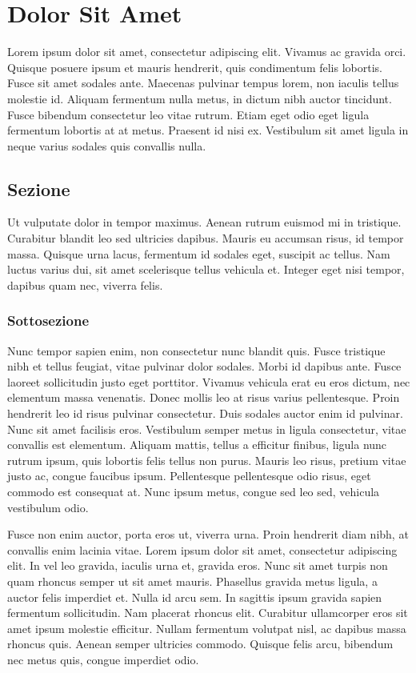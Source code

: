 \chapter{Dolor Sit Amet}
Lorem ipsum dolor sit amet, consectetur adipiscing elit. Vivamus ac gravida orci. Quisque posuere ipsum et mauris hendrerit, quis condimentum felis lobortis. Fusce sit amet sodales ante. Maecenas pulvinar tempus lorem, non iaculis tellus molestie id. Aliquam fermentum nulla metus, in dictum nibh auctor tincidunt. Fusce bibendum consectetur leo vitae rutrum. Etiam eget odio eget ligula fermentum lobortis at at metus. Praesent id nisi ex. Vestibulum sit amet ligula in neque varius sodales quis convallis nulla.



\section{Sezione}
Ut vulputate dolor in tempor maximus. Aenean rutrum euismod mi in tristique. Curabitur blandit leo sed ultricies dapibus. Mauris eu accumsan risus, id tempor massa. Quisque urna lacus, fermentum id sodales eget, suscipit ac tellus. Nam luctus varius dui, sit amet scelerisque tellus vehicula et. Integer eget nisi tempor, dapibus quam nec, viverra felis.

\subsection{Sottosezione}
Nunc tempor sapien enim, non consectetur nunc blandit quis. Fusce tristique nibh et tellus feugiat, vitae pulvinar dolor sodales. Morbi id dapibus ante. Fusce laoreet sollicitudin justo eget porttitor. Vivamus vehicula erat eu eros dictum, nec elementum massa venenatis. Donec mollis leo at risus varius pellentesque. Proin hendrerit leo id risus pulvinar consectetur. Duis sodales auctor enim id pulvinar. Nunc sit amet facilisis eros. Vestibulum semper metus in ligula consectetur, vitae convallis est elementum. Aliquam mattis, tellus a efficitur finibus, ligula nunc rutrum ipsum, quis lobortis felis tellus non purus. Mauris leo risus, pretium vitae justo ac, congue faucibus ipsum. Pellentesque pellentesque odio risus, eget commodo est consequat at. Nunc ipsum metus, congue sed leo sed, vehicula vestibulum odio.

Fusce non enim auctor, porta eros ut, viverra urna. Proin hendrerit diam nibh, at convallis enim lacinia vitae. Lorem ipsum dolor sit amet, consectetur adipiscing elit. In vel leo gravida, iaculis urna et, gravida eros. Nunc sit amet turpis non quam rhoncus semper ut sit amet mauris. Phasellus gravida metus ligula, a auctor felis imperdiet et. Nulla id arcu sem. In sagittis ipsum gravida sapien fermentum sollicitudin. Nam placerat rhoncus elit. Curabitur ullamcorper eros sit amet ipsum molestie efficitur. Nullam fermentum volutpat nisl, ac dapibus massa rhoncus quis. Aenean semper ultricies commodo. Quisque felis arcu, bibendum nec metus quis, congue imperdiet odio.


